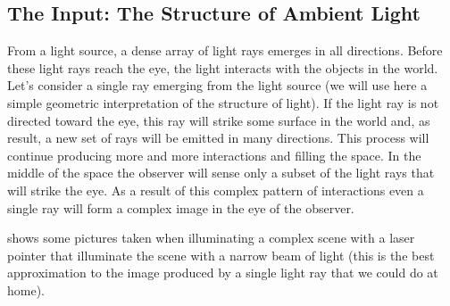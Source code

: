 \subsection{The Input: The Structure of Ambient Light}

From a light source, a dense array of light rays emerges in all directions. Before these light rays reach the eye, the light interacts with the objects in the world. Let's consider a single ray emerging from the light source (we will use here a simple geometric interpretation of the structure of light). If the light ray is not directed toward the eye, this ray will strike some surface in the world and, as result, a new set of rays will be emitted in many directions. This process will continue producing more and more interactions and filling the space. In the middle of the space the observer will sense only a subset of the light rays that will strike the eye. As a result of this complex pattern of interactions even a single ray will form a complex image in the eye of the observer.

\Fig{\ref{fig:lightRay}} shows some pictures taken when illuminating a complex scene with a laser pointer that illuminate the scene with a narrow beam of light (this is the best approximation to the image produced by a single light ray that we could do at home).

